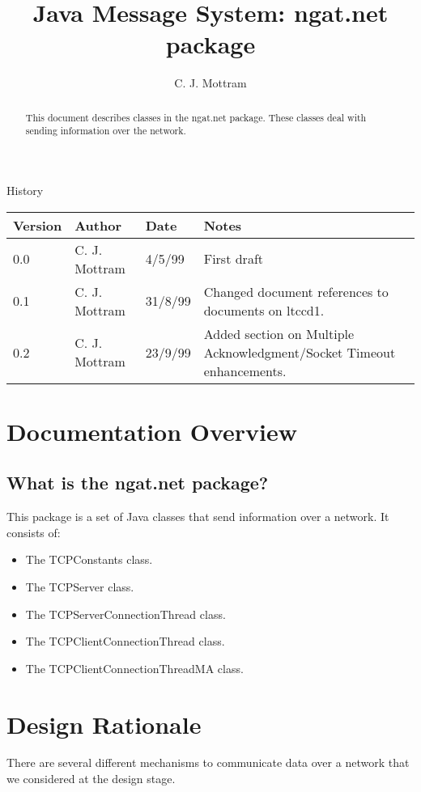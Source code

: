 \documentclass[10pt,a4paper]{article}
\title{Java Message System: ngat.net package}
\author{C. J. Mottram}
\date{}
\begin{document}
\thispagestyle{empty}
\maketitle
\begin{abstract}
This document describes classes in the ngat.net package.
These classes deal with sending information over the network.
\end{abstract}

\centerline{\Large History}
\begin{center}
\begin{tabular}{|l|l|l|p{15em}|}
\hline
{\bf Version} & {\bf Author} & {\bf Date} & {\bf Notes} \\
\hline
0.0 &              C. J. Mottram & 4/5/99 & First draft \\
0.1 &              C. J. Mottram & 31/8/99 & Changed document references to documents on ltccd1.\\
0.2 &              C. J. Mottram & 23/9/99 & Added section on Multiple Acknowledgment/Socket Timeout enhancements.\\
\hline
\end{tabular}
\end{center}

\newpage
\tableofcontents
\listoffigures
\listoftables
\newpage

\section{Documentation Overview}
\subsection{What is the ngat.net package?}
This package is a set of Java classes that send information over a network.
It consists of:
\begin{itemize}
\item The TCPConstants class.
\item The TCPServer class.
\item The TCPServerConnectionThread class.
\item The TCPClientConnectionThread class.
\item The TCPClientConnectionThreadMA class.
\end{itemize}

\section{Design Rationale}
There are several different mechanisms to communicate data over a network that we considered at the design stage.
\end{document}
